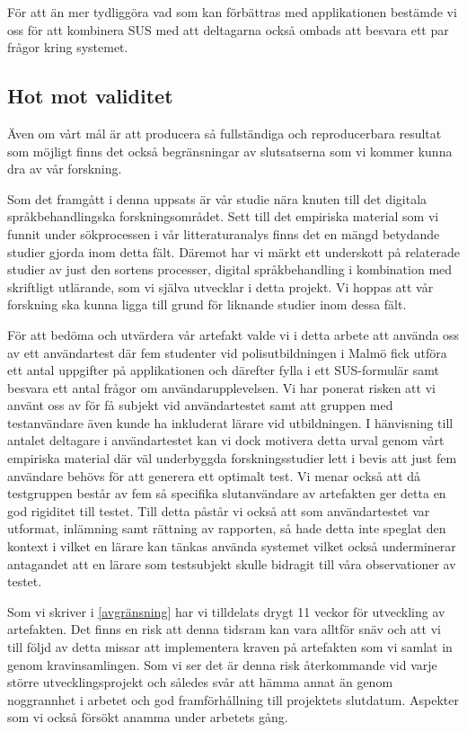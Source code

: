 \documentclass[swedish]{maucsthesis}
\begin{document}
För att än mer tydliggöra vad som kan förbättras med applikationen bestämde vi
oss för att kombinera SUS med att deltagarna också ombads att besvara ett par
frågor kring systemet.

\subsection{Hot mot validitet}

Även om vårt mål är att producera så fullständiga och reproducerbara resultat
som möjligt finns det också begränsningar av slutsatserna som vi kommer kunna
dra av vår forskning.

Som det framgått i denna uppsats är vår studie nära knuten till det
digitala språkbehandlingska forskningsområdet. Sett till det empiriska material som vi
funnit under sökprocessen i vår litteraturanalys finns det en mängd betydande
studier gjorda inom detta fält. Däremot har vi märkt ett underskott på
relaterade studier av just den sortens processer, digital språkbehandling i kombination
med skriftligt utlärande, som vi själva utvecklar i detta projekt. Vi
hoppas att vår forskning ska kunna ligga till grund för liknande studier inom
dessa fält.

För att bedöma och utvärdera vår artefakt valde vi i detta arbete att använda
oss av ett användartest där fem studenter vid polisutbildningen i Malmö fick
utföra ett antal uppgifter på applikationen och därefter fylla i ett
SUS-formulär samt besvara ett antal frågor om användarupplevelsen. Vi har
ponerat risken att vi använt oss av för få subjekt vid användartestet samt
att gruppen med testanvändare även kunde ha inkluderat lärare vid utbildningen.
I hänvisning till antalet deltagare i användartestet kan vi dock motivera detta
urval genom vårt empiriska material där väl underbyggda forskningsstudier lett i
bevis att just fem användare behövs för att generera ett optimalt test. Vi menar
också att då testgruppen består av fem så specifika slutanvändare av artefakten
ger detta en god rigiditet till testet. Till detta påstår vi också att som
användartestet var utformat, inlämning samt rättning av rapporten, så hade detta
inte speglat den kontext i vilket en lärare kan tänkas använda systemet vilket
också underminerar antagandet att en lärare som testsubjekt skulle bidragit till
våra observationer av testet.

Som vi skriver i \cref{avgränsning} har vi tilldelats drygt 11 veckor
för utveckling av artefakten. Det finns en risk att denna tidsram kan vara
alltför snäv och att vi till följd av detta missar att implementera kraven på
artefakten som vi samlat in genom kravinsamlingen. Som vi ser det är denna risk
återkommande vid varje större utvecklingsprojekt och således svår att hämma
annat än genom noggrannhet i arbetet och god framförhållning till projektets
slutdatum. Aspekter som vi också försökt anamma under arbetets gång.
\end{document}
